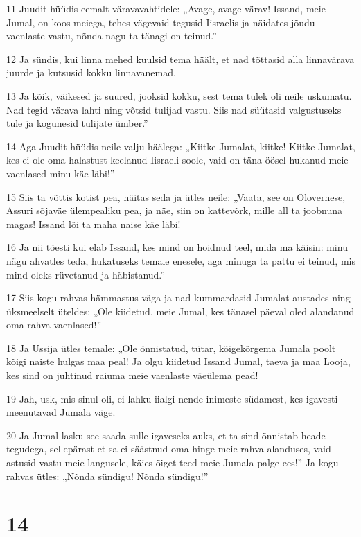 \par 11 Juudit hüüdis eemalt väravavahtidele: „Avage, avage värav! Issand, meie Jumal, on koos meiega, tehes vägevaid tegusid Iisraelis ja näidates jõudu vaenlaste vastu, nõnda nagu ta tänagi on teinud.”
\par 12 Ja sündis, kui linna mehed kuulsid tema häält, et nad tõttasid alla linnavärava juurde ja kutsusid kokku linnavanemad.
\par 13 Ja kõik, väikesed ja suured, jooksid kokku, sest tema tulek oli neile uskumatu. Nad tegid värava lahti ning võtsid tulijad vastu. Siis nad süütasid valgustuseks tule ja kogunesid tulijate ümber.”
\par 14 Aga Juudit hüüdis neile valju häälega: „Kiitke Jumalat, kiitke! Kiitke Jumalat, kes ei ole oma halastust keelanud Iisraeli soole, vaid on täna öösel hukanud meie vaenlased minu käe läbi!”
\par 15 Siis ta võttis kotist pea, näitas seda ja ütles neile: „Vaata, see on Olovernese, Assuri sõjaväe ülempealiku pea, ja näe, siin on kattevõrk, mille all ta joobnuna magas! Issand lõi ta maha naise käe läbi!
\par 16 Ja nii tõesti kui elab Issand, kes mind on hoidnud teel, mida ma käisin: minu nägu ahvatles teda, hukatuseks temale enesele, aga minuga ta pattu ei teinud, mis mind oleks rüvetanud ja häbistanud.”
\par 17 Siis kogu rahvas hämmastus väga ja nad kummardasid Jumalat austades ning üksmeelselt üteldes: „Ole kiidetud, meie Jumal, kes tänasel päeval oled alandanud oma rahva vaenlased!”
\par 18 Ja Ussija ütles temale: „Ole õnnistatud, tütar, kõigekõrgema Jumala poolt kõigi naiste hulgas maa peal! Ja olgu kiidetud Issand Jumal, taeva ja maa Looja, kes sind on juhtinud raiuma meie vaenlaste väeülema pead!
\par 19 Jah, usk, mis sinul oli, ei lahku iialgi nende inimeste südamest, kes igavesti meenutavad Jumala väge.
\par 20 Ja Jumal lasku see saada sulle igaveseks auks, et ta sind õnnistab heade tegudega, sellepärast et sa ei säästnud oma hinge meie rahva alanduses, vaid astusid vastu meie langusele, käies õiget teed meie Jumala palge ees!” Ja kogu rahvas ütles: „Nõnda sündigu! Nõnda sündigu!”


\chapter{14}

